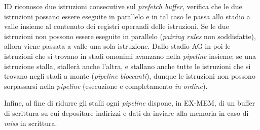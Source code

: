 ID riconosce due istruzioni consecutive sul \textit{prefetch buffer}, verifica che le due istruzioni
possano essere eseguite in parallelo e in tal caso le passa allo stadio a valle insieme al
contenuto dei registri operandi delle istruzioni. Se le due istruzioni non possono essere eseguite in parallelo (\textit{pairing rules} non soddisfatte), allora viene passata a valle una sola istruzione. Dallo stadio AG in poi le istruzioni che si trovano in stadi omonimi avanzano nella \textit{pipeline} insieme; se una istruzione stalla, stallerà anche l'altra, e stallano anche tutte le istruzioni che si trovano negli stadi a monte (\textit{pipeline} \textit{bloccanti}), dunque le istruzioni non possono sorpassarsi nella \textit{pipeline} (esecuzione e
completamento \textit{in ordine}).

Infine, al fine di ridurre gli stalli ogni \textit{pipeline} dispone, in EX-MEM, di un buffer di scrittura su cui
depositare indirizzi e dati da inviare alla memoria in caso di \textit{miss} in scrittura.
